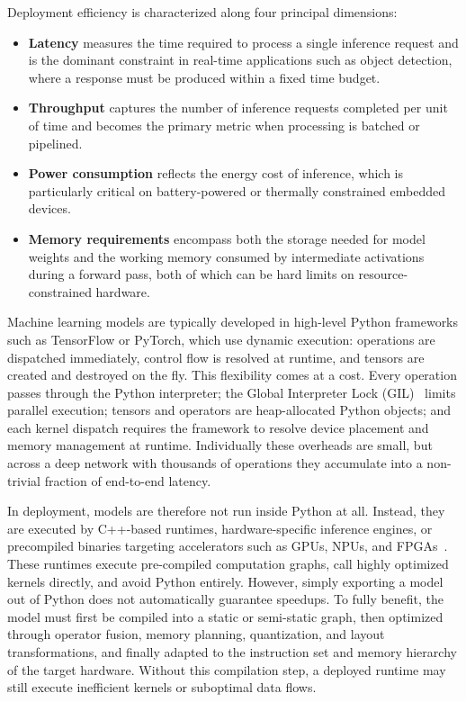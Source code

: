 \documentclass[12pt,a4paper]{report}
\begin{document}
\noindent Deployment efficiency is characterized along four principal dimensions:
\begin{itemize}
\item \textbf{Latency} measures the time
required to process a single inference request and is the dominant constraint in real-time applications such
as object detection, where a response must be produced within a fixed time budget.
\item \textbf{Throughput}
captures the number of inference requests completed per unit of time and becomes the primary metric when
processing is batched or pipelined.
\item \textbf{Power consumption} reflects the energy cost of inference, which
is particularly critical on battery-powered or thermally constrained embedded devices.
\item \textbf{Memory
requirements} encompass both the storage needed for model weights and the working memory consumed by
intermediate activations during a forward pass, both of which can be hard limits on resource-constrained
hardware.
\end{itemize}

Machine learning models are typically developed in high-level Python frameworks such as TensorFlow or
PyTorch, which use dynamic execution: operations are dispatched immediately, control flow is resolved at
runtime, and tensors are created and destroyed on the fly. This flexibility comes at a cost. Every operation
passes through the Python interpreter; the Global Interpreter Lock (GIL)~\cite{python_capi_gil} limits parallel execution;
tensors and operators are heap-allocated Python objects; and each kernel dispatch requires the framework to resolve
device placement and memory management at runtime. Individually these overheads are small, but across a deep
network with thousands of operations they accumulate into a non-trivial fraction of end-to-end latency.

In deployment, models are therefore not run inside Python at all. Instead, they are executed by C++-based
runtimes, hardware-specific inference engines, or precompiled binaries targeting accelerators such as GPUs,
NPUs, and FPGAs~\cite{chen2018tvm,onnxruntime_execution_providers,nvidia_tensorrt_docs}. These runtimes execute
pre-compiled computation graphs, call highly optimized kernels
directly, and avoid Python entirely. However, simply exporting a model out of Python does not automatically
guarantee speedups. To fully benefit, the model must first be compiled into a static or semi-static graph,
then optimized through operator fusion, memory planning, quantization, and layout transformations, and
finally adapted to the instruction set and memory hierarchy of the target hardware. Without this compilation
step, a deployed runtime may still execute inefficient kernels or suboptimal data flows.
\end{document}
